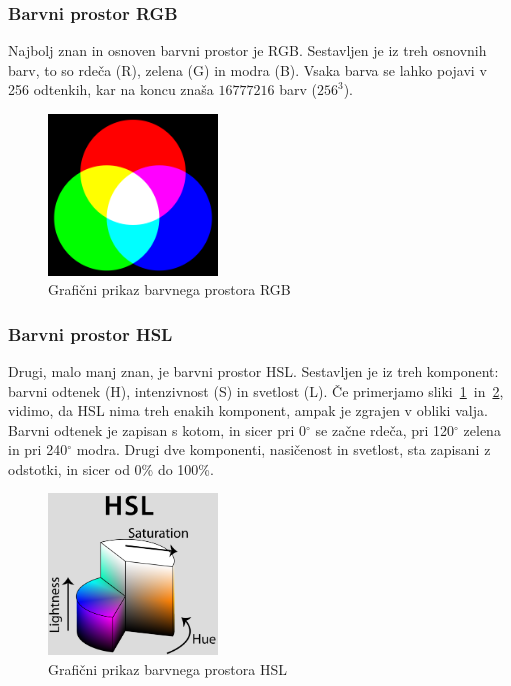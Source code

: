 \documentclass[a4paper, 12pt]{book}
\begin{document}
\subsubsection*{Barvni prostor RGB}
Najbolj znan in osnoven barvni prostor je RGB. Sestavljen je iz treh
osnovnih barv, to so rdeča (R), zelena (G) in modra (B). Vsaka barva se lahko
pojavi v 256 odtenkih, kar na koncu znaša $16777216$ barv ($256^3$).

\begin{figure}[!ht]
    \centering
    \includegraphics[width=0.4\textwidth]{rgb}
    \caption{Grafični prikaz barvnega prostora RGB}
    \label{fig:rgb}
\end{figure}


\subsubsection*{Barvni prostor HSL}
Drugi, malo manj znan, je barvni prostor HSL. Sestavljen je iz treh
komponent: barvni odtenek (H), intenzivnost (S) in svetlost (L). Če primerjamo
sliki~\ref{fig:rgb}~in~\ref{fig:hsl}, vidimo, da HSL nima treh enakih
komponent, ampak je zgrajen v obliki valja. Barvni odtenek je zapisan s
kotom, in sicer pri 0$^{\circ}$ se začne rdeča, pri 120$^{\circ}$ zelena in pri
240$^{\circ}$ modra. Drugi dve komponenti, nasičenost in svetlost, sta
zapisani z odstotki, in sicer od 0\% do 100\%.

\begin{figure}[!ht]
    \centering
    \includegraphics[width=0.4\textwidth]{hsl}
    \caption{Grafični prikaz barvnega prostora HSL}
    \label{fig:hsl}
\end{figure}
\end{document}
